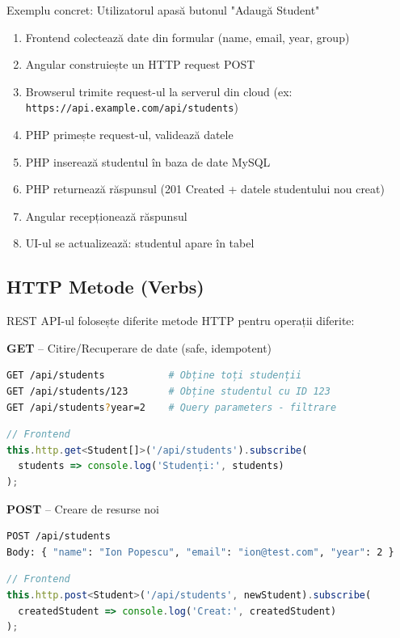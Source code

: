 Exemplu concret: Utilizatorul apasă butonul "Adaugă Student"

\begin{enumerate}
  \item Frontend colectează date din formular (name, email, year, group)
  \item Angular construiește un HTTP request POST
  \item Browserul trimite request-ul la serverul din cloud (ex: \texttt{https://api.example.com/api/students})
  \item PHP primește request-ul, validează datele
  \item PHP inserează studentul în baza de date MySQL
  \item PHP returnează răspunsul (201 Created + datele studentului nou creat)
  \item Angular recepționează răspunsul
  \item UI-ul se actualizează: studentul apare în tabel
\end{enumerate}

\subsection{HTTP Metode (Verbs)}

REST API-ul folosește diferite metode HTTP pentru operații diferite:

\textbf{GET} – Citire/Recuperare de date (safe, idempotent)
\begin{lstlisting}[language=bash]
GET /api/students           # Obține toți studenții
GET /api/students/123       # Obține studentul cu ID 123
GET /api/students?year=2    # Query parameters - filtrare
\end{lstlisting}

\begin{lstlisting}[language=TypeScript]
// Frontend
this.http.get<Student[]>('/api/students').subscribe(
  students => console.log('Studenți:', students)
);
\end{lstlisting}

\textbf{POST} – Creare de resurse noi

\begin{lstlisting}[language=bash]
POST /api/students
Body: { "name": "Ion Popescu", "email": "ion@test.com", "year": 2 }
\end{lstlisting}

\begin{lstlisting}[language=TypeScript]
// Frontend
this.http.post<Student>('/api/students', newStudent).subscribe(
  createdStudent => console.log('Creat:', createdStudent)
);
\end{lstlisting}

